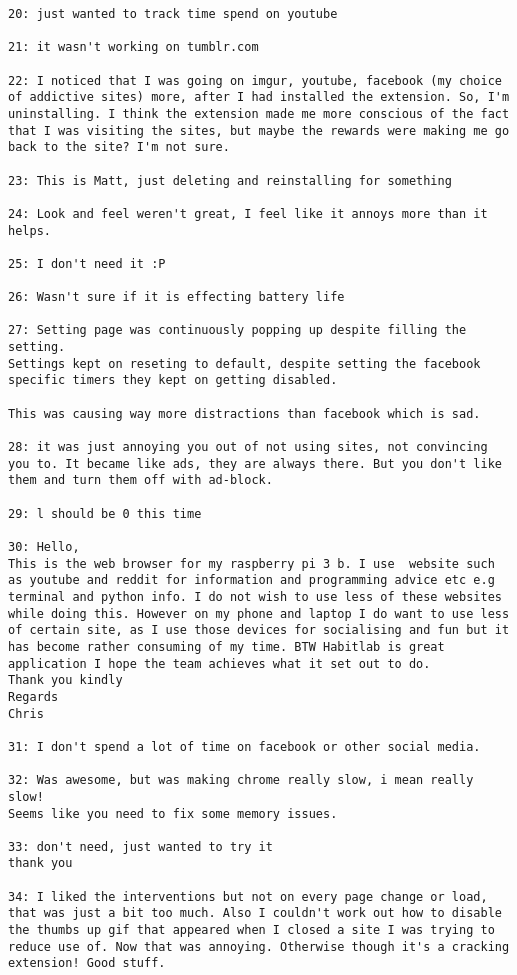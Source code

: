 \begin{lstlisting}[breaklines]
20: just wanted to track time spend on youtube

21: it wasn't working on tumblr.com

22: I noticed that I was going on imgur, youtube, facebook (my choice of addictive sites) more, after I had installed the extension. So, I'm uninstalling. I think the extension made me more conscious of the fact that I was visiting the sites, but maybe the rewards were making me go back to the site? I'm not sure.

23: This is Matt, just deleting and reinstalling for something

24: Look and feel weren't great, I feel like it annoys more than it helps.

25: I don't need it :P

26: Wasn't sure if it is effecting battery life

27: Setting page was continuously popping up despite filling the setting.
Settings kept on reseting to default, despite setting the facebook specific timers they kept on getting disabled.

This was causing way more distractions than facebook which is sad.

28: it was just annoying you out of not using sites, not convincing you to. It became like ads, they are always there. But you don't like them and turn them off with ad-block.

29: l should be 0 this time

30: Hello,
This is the web browser for my raspberry pi 3 b. I use  website such as youtube and reddit for information and programming advice etc e.g terminal and python info. I do not wish to use less of these websites while doing this. However on my phone and laptop I do want to use less of certain site, as I use those devices for socialising and fun but it has become rather consuming of my time. BTW Habitlab is great application I hope the team achieves what it set out to do.
Thank you kindly
Regards
Chris

31: I don't spend a lot of time on facebook or other social media.

32: Was awesome, but was making chrome really slow, i mean really slow!
Seems like you need to fix some memory issues.

33: don't need, just wanted to try it
thank you

34: I liked the interventions but not on every page change or load, that was just a bit too much. Also I couldn't work out how to disable the thumbs up gif that appeared when I closed a site I was trying to reduce use of. Now that was annoying. Otherwise though it's a cracking extension! Good stuff.


\end{lstlisting}
